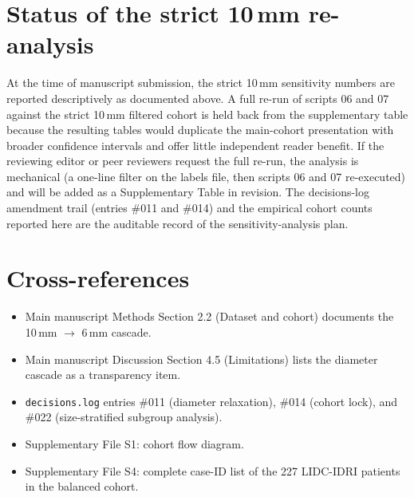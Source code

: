 \documentclass[11pt,a4paper]{article}
\begin{document}
\section*{Status of the strict 10\,mm re-analysis}

At the time of manuscript submission, the strict 10\,mm sensitivity numbers are reported descriptively as documented above. A full re-run of scripts 06 and 07 against the strict 10\,mm filtered cohort is held back from the supplementary table because the resulting tables would duplicate the main-cohort presentation with broader confidence intervals and offer little independent reader benefit. If the reviewing editor or peer reviewers request the full re-run, the analysis is mechanical (a one-line filter on the labels file, then scripts 06 and 07 re-executed) and will be added as a Supplementary Table in revision. The decisions-log amendment trail (entries \#011 and \#014) and the empirical cohort counts reported here are the auditable record of the sensitivity-analysis plan.

\section*{Cross-references}

\begin{itemize}
    \item Main manuscript Methods Section 2.2 (Dataset and cohort) documents the 10\,mm $\rightarrow$ 6\,mm cascade.
    \item Main manuscript Discussion Section 4.5 (Limitations) lists the diameter cascade as a transparency item.
    \item \texttt{decisions.log} entries \#011 (diameter relaxation), \#014 (cohort lock), and \#022 (size-stratified subgroup analysis).
    \item Supplementary File S1: cohort flow diagram.
    \item Supplementary File S4: complete case-ID list of the 227 LIDC-IDRI patients in the balanced cohort.
\end{itemize}
\end{document}
